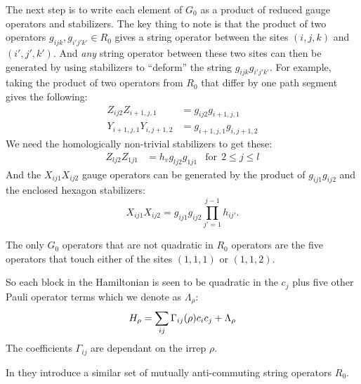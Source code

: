 The next step is to write each element of $G_0$
as a product of reduced gauge operators and stabilizers.
The key thing to note is that the product of two
operators $g_{ijk}, g_{i'j'k'}\in R_0$ gives a string
operator between the sites $(i,j,k)$ and $(i',j',k')$.
And {\it any} string operator between these
two sites can then be generated by using stabilizers to
``deform'' the string $g_{ijk}g_{i'j'k'}.$
For example, taking the product
of two operators from $R_0$ that differ
by one path segment gives the following:
\begin{align*}
Z_{ij2}Z_{i+1,j,1} &= g_{ij2} g_{i+1,j,1} \\
Y_{i+1,j,1}Y_{i,j+1,2} &= g_{i+1,j,1}g_{i,j+1,2}
\end{align*}
We need the homologically non-trivial stabilizers to get these:
\begin{align*}
Z_{lj2}Z_{1j1} &= h_v g_{lj2} g_{1j1} &\mbox{for}\ \  2\le j\le l
\end{align*}
And the $X_{ij1}X_{ij2}$
gauge operators can be generated
by the product of 
$g_{ij1}g_{ij2}$ and the enclosed hexagon stabilizers:
$$X_{ij1}X_{ij2}=g_{ij1}g_{ij2}\prod_{j'=1}^{j-1} h_{ij'}.$$

The only $G_0$ operators that are not 
quadratic in $R_0$ operators are the five
operators that touch either of the sites
$(1,1,1)$ or $(1,1,2)$.

So each block in the Hamiltonian
is seen to be quadratic in the $c_j$ plus
five other Pauli operator terms which we denote as $\Lambda_\rho$:
$$
    H_\rho = \sum_{ij} \Gamma_{ij}(\rho) c_i c_j + \Lambda_\rho
$$
The coefficients $\Gamma_{ij}$ are dependant on the irrep $\rho.$

In \cite{Kells2009} they introduce a similar set of
mutually anti-commuting string operators $R_0.$


%

\def\Cn{\Complex[2^n]}
\def\Cr{\Complex[2^r]}
\def\Field{\mathcal{F}_2}
\def\Fn{\Field^n}
\def\Fm{\Field^m}
\def\Fr{\Field^r}
\def\Fnd{\Field^{n*}}
\def\Fmd{\Field^{m*}}
\def\Frd{\Field^{r*}}

